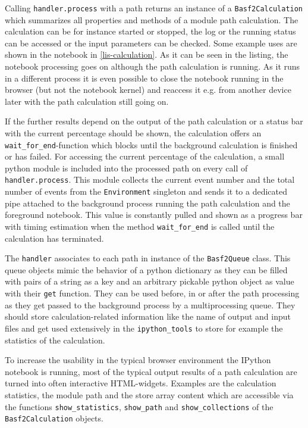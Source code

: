 Calling \texttt{handler.process} with a path returns an instance of a \texttt{Basf2Calculation} which summarizes all properties and methods of a module path calculation. The calculation can be for instance started or stopped, the log or the running status can be accessed or the input parameters can be checked. Some example uses are shown in the notebook in \autoref{lis-calculation}. As it can be seen in the listing, the notebook processing goes on although the path calculation is running. As it runs in a different process it is even possible to close the notebook running in the browser (but not the notebook kernel) and reaccess it e.g. from another device later with the path calculation still going on.

If the further results depend on the output of the path calculation or a status bar with the current percentage should be shown, the calculation offers an \verb+wait_for_end+-function which blocks until the background calculation is finished or has failed. For accessing the current percentage of the calculation, a small python module is included into the processed path on every call of \texttt{handler.process}. This module collects the current event number and the total number of events from the \texttt{Environment} singleton and sends it to a dedicated pipe attached to the background process running the path calculation and the foreground notebook. This value is constantly pulled and shown as a progress bar with timing estimation when the method \verb+wait_for_end+ is called until the calculation has terminated.

The \texttt{handler} associates to each path in instance of the \texttt{Basf2Queue} class. This queue objects mimic the behavior of a python dictionary as they can be filled with pairs of a string as a key and an arbitrary pickable python object as value with their \verb+get+ function. They can be used before, in or after the path processing as they get passed to the background process by a multiprocessing queue. They should store calculation-related information like the name of output and input files and get used extensively in the \texttt{ipython\_tools} to store for example the statistics of the calculation.

To increase the usability in the typical browser environment the IPython notebook is running, most of the typical output results of a path calculation are turned into often interactive HTML-widgets. Examples are the calculation statistics, the module path and the store array content which are accessible via the functions \verb+show_statistics+, \verb+show_path+ and \verb+show_collections+ of the \texttt{Basf2Calculation} objects.

